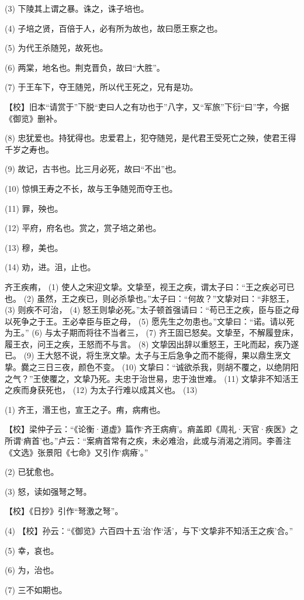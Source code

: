 \documentclass[12pt,UTF8]{ctexbook}
\begin{document}
(3) 下陵其上谓之暴。诛之，诛子培也。

(4) 子培之贤，百倍于人，必有所为故也，故曰愿王察之也。

(5) 为代王杀随兕，故死也。

(6) 两棠，地名也。荆克晋负，故曰“大胜”。

(7) 于王车下，夺王随兕，所以代王死之，兄有是功。

【校】旧本“请赏于”下脱“吏曰人之有功也于”八字，又“军旅”下衍“曰”字，今据《御览》删补。

(8) 忠犹爱也。持犹得也。忠爱君上，犯夺随兕，是代君王受死亡之殃，使君王得千岁之寿也。

(9) 故记，古书也。比三月必死，故曰“不出”也。

(10) 惊惧王寿之不长，故与王争随兕而夺王也。

(11) 罪，殃也。

(12) 平府，府名也。赏之，赏子培之弟也。

(13) 穆，美也。

(14) 劝，进。沮，止也。

齐王疾痏， (1) 使人之宋迎文挚。文挚至，视王之疾，谓太子曰：“王之疾必可已也。 (2) 虽然，王之疾已，则必杀挚也。”太子曰：“何故？”文挚对曰：“非怒王， (3) 则疾不可治， (4) 怒王则挚必死。”太子顿首强请曰：“苟已王之疾，臣与臣之母以死争之于王。王必幸臣与臣之母， (5) 愿先生之勿患也。”文挚曰：“诺。请以死为王。” (6) 与太子期而将往不当者三， (7) 齐王固已怒矣。文挚至，不解履登床，履王衣，问王之疾，王怒而不与言。 (8) 文挚因出辞以重怒王，王叱而起，疾乃遂已。 (9) 王大怒不说，将生烹文挚。太子与王后急争之而不能得，果以鼎生烹文挚。爨之三日三夜，颜色不变。 (10) 文挚曰：“诚欲杀我，则胡不覆之，以绝阴阳之气？”王使覆之，文挚乃死。夫忠于治世易，忠于浊世难。 (11) 文挚非不知活王之疾而身获死也， (12) 为太子行难以成其义也。 (13)

(1) 齐王，湣王也，宣王之子。痏，病痏也。

【校】梁仲子云：“《论衡·道虚》篇作‘齐王病痟’。痟盖即《周礼·天官·疾医》之所谓‘痟首’也。”卢云：“案痟首常有之疾，未必难治，此或与消渴之消同。李善注《文选》张景阳《七命》又引作‘病瘠’。”

(2) 已犹愈也。

(3) 怒，读如强弩之弩。

【校】《日抄》引作“弩激之弩”。

(4) 【校】孙云：“《御览》六百四十五‘治’作‘活’，与下‘文挚非不知活王之疾’合。”

(5) 幸，哀也。

(6) 为，治也。

(7) 三不如期也。
\end{document}
